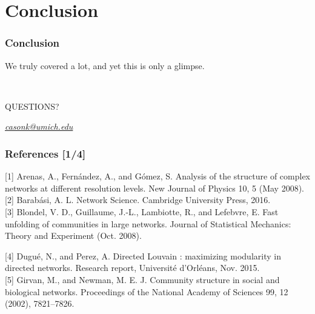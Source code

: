 \documentclass{beamer}
\newcommand{\XB}{\color{black}}
\newcommand{\XR}{\color{red}}
\begin{document}

\section{Conclusion}

\begin{frame}
    \frametitle{Conclusion}

    We truly covered a lot, and yet this is only a glimpse.\pause

    \hrulefill \\
    \Large{\centerline{\XR QUESTIONS?\XB}}
    \normalsize{\centerline{\textit{\href{mailto:casonk@umich.edu}{casonk@umich.edu}}}}

\end{frame}

\begin{frame}
    \frametitle{References [1/4]}

    [1] Arenas, A., Fern{\'{a}}ndez, A., and G{\'{o}}mez, S.
    Analysis of the structure of complex networks at
    different resolution levels. New Journal of Physics 10, 5
    (May 2008). \\

    [2] Barab{\'{a}}si, A. L. Network Science. Cambridge
    University Press, 2016. \\

    [3] Blondel, V. D., Guillaume, J.-L., Lambiotte, R.,
    and Lefebvre, E. Fast unfolding of communities in
    large networks. Journal of Statistical Mechanics: Theory
    and Experiment (Oct. 2008).

    [4] Dugu{\'{e}}, N., and Perez, A. Directed Louvain :
    maximizing modularity in directed networks. Research
    report, Universit{\'{e}} d'Orl{\'{e}}ans, Nov. 2015. \\

    [5] Girvan, M., and Newman, M. E. J. Community
    structure in social and biological networks. Proceedings
    of the National Academy of Sciences 99, 12 (2002),
    7821–7826.

\end{frame}
\end{document}
